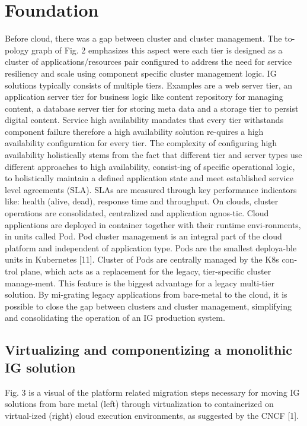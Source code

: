 \documentclass[runningheads]{llncs}
\begin{document}
\section{Foundation}
Before cloud, there was a gap between cluster and cluster management. The to-pology graph of Fig. 2 emphasizes this aspect were each tier is designed as a cluster of applications/resources pair configured to address the need for service resiliency and scale using component specific cluster management logic. IG solutions typically consists of multiple tiers. Examples are a web server tier, an application server tier for business logic like content repository for managing content, a database server tier for storing meta data and a storage tier to persist digital content. Service high availability mandates that every tier withstands component failure therefore a high availability solution re-quires a high availability configuration for every tier. The complexity of configuring high availability holistically stems from the fact that different tier and server types use different approaches to high availability, consist-ing of specific operational logic, to holistically maintain a defined application state and meet established service level agreements (SLA). SLAs are measured through key performance indicators like: health (alive, dead), response time and throughput. 
On clouds, cluster operations are consolidated, centralized and application agnos-tic. Cloud applications are deployed in container together with their runtime envi-ronments, in units called Pod. Pod cluster management is an integral part of the cloud platform and independent of application type. Pods are the smallest deploya-ble units in Kubernetes [11]. Cluster of Pods are centrally managed by the K8s con-trol plane, which acts as a replacement for the legacy, tier-specific cluster manage-ment. This feature is the biggest advantage for a legacy multi-tier solution. By mi-grating legacy applications from bare-metal to the cloud, it is possible to close the gap between clusters and cluster management, simplifying and consolidating the operation of an IG production system.

\subsection{ Virtualizing and componentizing a monolithic IG solution}
Fig. 3 is a visual of the platform related migration steps necessary for moving IG solutions from bare metal (left) through virtualization to containerized on virtual-ized (right) cloud execution environments, as suggested by the CNCF [1].
\end{document}
